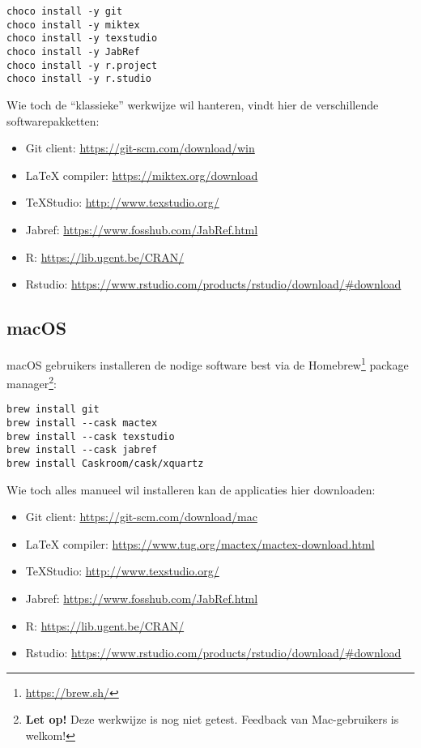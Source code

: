 \begin{verbatim}
choco install -y git
choco install -y miktex
choco install -y texstudio
choco install -y JabRef
choco install -y r.project
choco install -y r.studio
\end{verbatim}

Wie toch de ``klassieke'' werkwijze wil hanteren, vindt hier de verschillende softwarepakketten:

\begin{itemize}
  \item Git client: \url{https://git-scm.com/download/win}
  \item \LaTeX{} compiler: \url{https://miktex.org/download}
  \item TeXStudio: \url{http://www.texstudio.org/}
  \item Jabref: \url{https://www.fosshub.com/JabRef.html}
  \item R: \url{https://lib.ugent.be/CRAN/}
  \item Rstudio: \url{https://www.rstudio.com/products/rstudio/download/#download}
\end{itemize}

\subsection{macOS}

macOS gebruikers installeren de nodige software best via de Homebrew\footnote{\url{https://brew.sh/}} package manager\footnote{\textbf{Let op!} Deze werkwijze is nog niet getest. Feedback van Mac-gebruikers is welkom!}:

\begin{verbatim}
brew install git
brew install --cask mactex
brew install --cask texstudio
brew install --cask jabref
brew install Caskroom/cask/xquartz
\end{verbatim}

Wie toch alles manueel wil installeren kan de applicaties hier downloaden:

\begin{itemize}
  \item Git client: \url{https://git-scm.com/download/mac}
  \item \LaTeX{} compiler: \url{https://www.tug.org/mactex/mactex-download.html}
  \item TeXStudio: \url{http://www.texstudio.org/}
  \item Jabref: \url{https://www.fosshub.com/JabRef.html}
  \item R: \url{https://lib.ugent.be/CRAN/}
  \item Rstudio: \url{https://www.rstudio.com/products/rstudio/download/#download}
\end{itemize}


